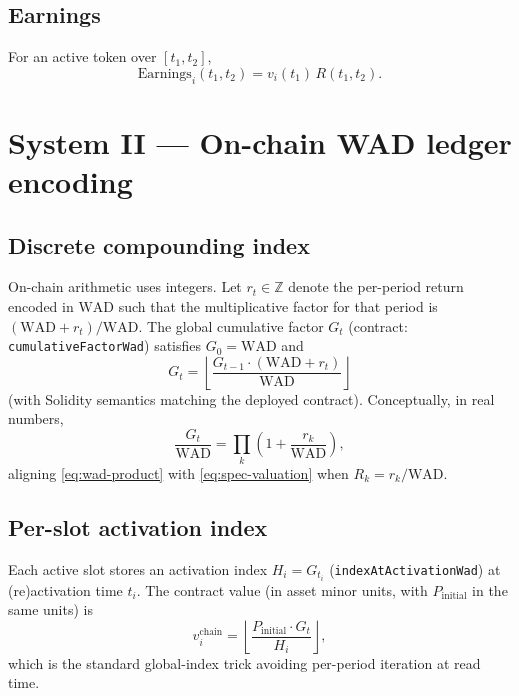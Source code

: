 \documentclass[11pt,a4paper]{article}
\newcommand{\WAD}{\mathrm{WAD}}
\begin{document}
\subsection{Earnings}

For an active token over $[t_1,t_2]$,
\begin{equation}
\mathrm{Earnings}_i(t_1,t_2) = v_i(t_1)\, R(t_1,t_2).
\end{equation}

\section{System II --- On-chain WAD ledger encoding}
\label{sec:wad-ledger}

\subsection{Discrete compounding index}

On-chain arithmetic uses integers. Let $r_t \in \mathbb{Z}$ denote the per-period return encoded in
$\WAD$ such that the multiplicative factor for that period is $(\WAD + r_t)/\WAD$. The global
cumulative factor $G_t$ (contract: \texttt{cumulativeFactorWad}) satisfies $G_0 = \WAD$ and
\begin{equation}
\label{eq:wad-recurrence}
G_{t} = \left\lfloor \frac{G_{t-1} \cdot (\WAD + r_t)}{\WAD} \right\rfloor
\end{equation}
(with Solidity semantics matching the deployed contract). Conceptually, in real numbers,
\begin{equation}
\label{eq:wad-product}
\frac{G_t}{\WAD} = \prod_k \left(1 + \frac{r_k}{\WAD}\right),
\end{equation}
aligning \eqref{eq:wad-product} with \eqref{eq:spec-valuation} when $R_k = r_k/\WAD$.

\subsection{Per-slot activation index}

Each active slot stores an activation index $H_i = G_{t_i}$ (\texttt{indexAtActivationWad}) at
(re)activation time $t_i$. The contract value (in asset minor units, with $P_{\mathrm{initial}}$ in
the same units) is
\begin{equation}
\label{eq:slot-value}
v_i^{\mathrm{chain}} = \left\lfloor \frac{P_{\mathrm{initial}} \cdot G_t}{H_i} \right\rfloor,
\end{equation}
which is the standard global-index trick avoiding per-period iteration at read time.
\end{document}
